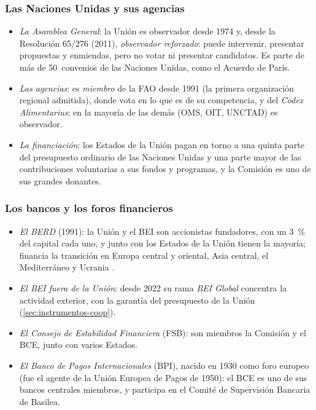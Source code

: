 \documentclass[11pt]{article}
\begin{document}
\subsubsection{Las Naciones Unidas y sus agencias}\label{sec:org-onu}

\begin{itemize}
\item \emph{La Asamblea General}: la Unión es observador desde 1974 y, desde la Resolución 65/276 (2011), \emph{observador reforzado}: puede intervenir, presentar propuestas y enmiendas, pero no votar ni presentar candidatos\nocite{PE2026FichaOrganizaciones}. Es parte de más de 50~convenios de las Naciones Unidas, como el Acuerdo de París.
\item \emph{Las agencias}: es \emph{miembro} de la FAO desde 1991 (la primera organización regional admitida), donde vota en lo que es de su competencia, y del \emph{Codex Alimentarius}; en la mayoría de las demás (OMS, OIT, UNCTAD) es observador.
\item \emph{La financiación}: los Estados de la Unión pagan en torno a una quinta parte del presupuesto ordinario de las Naciones Unidas y una parte mayor de las contribuciones voluntarias a sus fondos y programas, y la Comisión es uno de sus grandes donantes.
\end{itemize}

\subsubsection{Los bancos y los foros financieros}\label{sec:org-bancos}

\begin{itemize}
\item \emph{El BERD} (1991): la Unión y el BEI son accionistas fundadores, con un 3~\% del capital cada uno, y junto con los Estados de la Unión tienen la mayoría; financia la transición en Europa central y oriental, Asia central, el Mediterráneo y Ucrania .
\item \emph{El BEI fuera de la Unión}: desde 2022 su rama \emph{BEI Global} concentra la actividad exterior, con la garantía del presupuesto de la Unión\nocite{CE2026GlobalGateway} (\ref{sec:instrumentos-coop}).
\item \emph{El Consejo de Estabilidad Financiera} (FSB): son miembros la Comisión y el BCE, junto con varios Estados.
\item \emph{El Banco de Pagos Internacionales} (BPI), nacido en 1930 como foro europeo (fue el agente de la Unión Europea de Pagos de 1950): el BCE es uno de sus bancos centrales miembros, y participa en el Comité de Supervisión Bancaria de Basilea.
\end{itemize}
\end{document}
